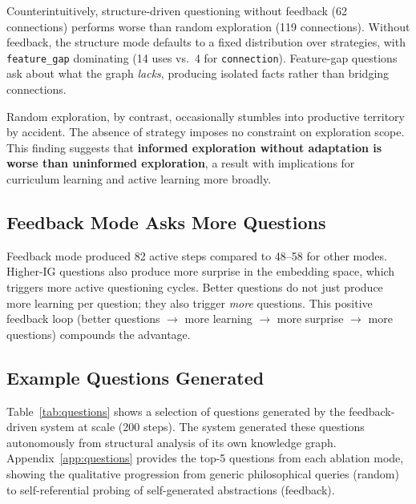 \documentclass[conference]{IEEEtran}
\begin{document}
Counterintuitively, structure-driven questioning without feedback (62 connections) performs worse than random exploration (119 connections). Without feedback, the structure mode defaults to a fixed distribution over strategies, with \texttt{feature\_gap} dominating (14 uses vs.\ 4 for \texttt{connection}). Feature-gap questions ask about what the graph \emph{lacks}, producing isolated facts rather than bridging connections.

Random exploration, by contrast, occasionally stumbles into productive territory by accident. The absence of strategy imposes no constraint on exploration scope. This finding suggests that \textbf{informed exploration without adaptation is worse than uninformed exploration}, a result with implications for curriculum learning and active learning more broadly.

\subsection{Feedback Mode Asks More Questions}

Feedback mode produced 82 active steps compared to 48--58 for other modes. Higher-IG questions also produce more surprise in the embedding space, which triggers more active questioning cycles. Better questions do not just produce more learning per question; they also trigger \emph{more} questions. This positive feedback loop (better questions $\to$ more learning $\to$ more surprise $\to$ more questions) compounds the advantage.

\subsection{Example Questions Generated}

Table~\ref{tab:questions} shows a selection of questions generated by the feedback-driven system at scale (200 steps). The system generated these questions autonomously from structural analysis of its own knowledge graph. Appendix~\ref{app:questions} provides the top-5 questions from each ablation mode, showing the qualitative progression from generic philosophical queries (random) to self-referential probing of self-generated abstractions (feedback).
\end{document}
